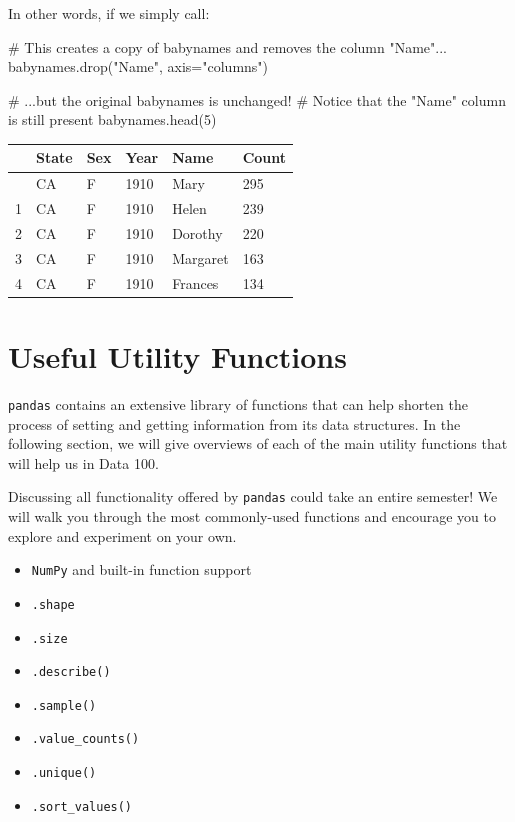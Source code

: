 \documentclass[
  letterpaper,
  DIV=11,
  numbers=noendperiod]{scrreprt}
\newenvironment{Shaded}{\begin{snugshade}}{\end{snugshade}}
\newcommand{\CommentTok}[1]{\textcolor[rgb]{0.37,0.37,0.37}{#1}}
\newcommand{\DecValTok}[1]{\textcolor[rgb]{0.68,0.00,0.00}{#1}}
\newcommand{\NormalTok}[1]{\textcolor[rgb]{0.00,0.23,0.31}{#1}}
\newcommand{\OperatorTok}[1]{\textcolor[rgb]{0.37,0.37,0.37}{#1}}
\newcommand{\StringTok}[1]{\textcolor[rgb]{0.13,0.47,0.30}{#1}}
\providecommand{\tightlist}{%
  \setlength{\itemsep}{0pt}\setlength{\parskip}{0pt}}\usepackage{longtable,booktabs,array}
\begin{document}
In other words, if we simply call:

\begin{Shaded}
\begin{Highlighting}[]
\CommentTok{\# This creates a copy of \textasciigrave{}babynames\textasciigrave{} and removes the column "Name"...}
\NormalTok{babynames.drop(}\StringTok{"Name"}\NormalTok{, axis}\OperatorTok{=}\StringTok{"columns"}\NormalTok{)}

\CommentTok{\# ...but the original \textasciigrave{}babynames\textasciigrave{} is unchanged! }
\CommentTok{\# Notice that the "Name" column is still present}
\NormalTok{babynames.head(}\DecValTok{5}\NormalTok{)}
\end{Highlighting}
\end{Shaded}

\begin{longtable}[]{@{}llllll@{}}
\toprule\noalign{}
& State & Sex & Year & Name & Count \\
\midrule\noalign{}
\endhead
\bottomrule\noalign{}
\endlastfoot
0 & CA & F & 1910 & Mary & 295 \\
1 & CA & F & 1910 & Helen & 239 \\
2 & CA & F & 1910 & Dorothy & 220 \\
3 & CA & F & 1910 & Margaret & 163 \\
4 & CA & F & 1910 & Frances & 134 \\
\end{longtable}

\section{Useful Utility Functions}\label{useful-utility-functions}

\texttt{pandas} contains an extensive library of functions that can help
shorten the process of setting and getting information from its data
structures. In the following section, we will give overviews of each of
the main utility functions that will help us in Data 100.

Discussing all functionality offered by \texttt{pandas} could take an
entire semester! We will walk you through the most commonly-used
functions and encourage you to explore and experiment on your own.

\begin{itemize}
\tightlist
\item
  \texttt{NumPy} and built-in function support
\item
  \texttt{.shape}
\item
  \texttt{.size}
\item
  \texttt{.describe()}
\item
  \texttt{.sample()}
\item
  \texttt{.value\_counts()}
\item
  \texttt{.unique()}
\item
  \texttt{.sort\_values()}
\end{itemize}
\end{document}
